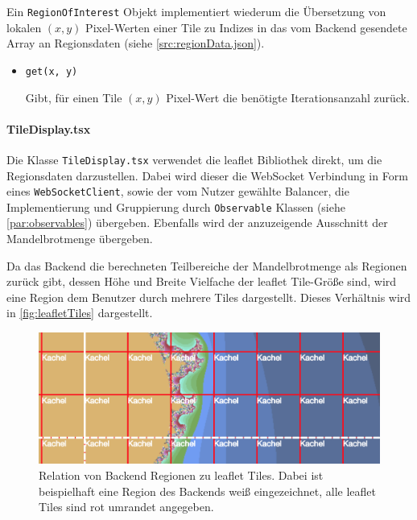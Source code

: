 Ein \verb|RegionOfInterest| Objekt implementiert wiederum die Übersetzung von lokalen \( (x,y) \) Pixel-Werten
einer Tile zu Indizes in das vom Backend gesendete Array an Regionsdaten (siehe \autoref{src:regionData.json}).
\begin{itemize}
	\item \verb|get(x, y)|

	      Gibt, für einen Tile \( (x,y) \) Pixel-Wert die benötigte Iterationsanzahl zurück.
\end{itemize}


\paragraph{TileDisplay.tsx}
Die Klasse \verb|TileDisplay.tsx| verwendet die leaflet Bibliothek direkt, um die Regionsdaten darzustellen.
Dabei wird dieser die WebSocket Verbindung in Form eines \verb|WebSocketClient|, sowie der vom Nutzer gewählte Balancer,
die Implementierung und Gruppierung durch \verb|Observable| Klassen (siehe \autoref{par:observables}) übergeben. Ebenfalls wird der anzuzeigende Ausschnitt der
Mandelbrotmenge übergeben.

Da das Backend die berechneten Teilbereiche der Mandelbrotmenge als Regionen zurück gibt, dessen Höhe und Breite
Vielfache der leaflet Tile-Größe sind, wird eine Region dem Benutzer durch mehrere Tiles dargestellt.
Dieses Verhältnis wird in \autoref{fig:leafletTiles} dargestellt.

\begin{figure}
	\centering
	\includegraphics[width=0.5\linewidth]{img/Implementierung/leafletTiles}
	\caption{Relation von Backend Regionen zu leaflet Tiles.
		Dabei ist beispielhaft eine Region des Backends
		weiß eingezeichnet, alle leaflet Tiles sind rot umrandet angegeben.
	}\label{fig:leafletTiles}
\end{figure}

